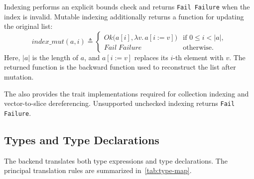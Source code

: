 Indexing performs an explicit bounds check and returns \texttt{Fail Failure} when the index is invalid.  Mutable indexing additionally returns a function for updating the original list:
\begin{equation}
  \mathit{index\_mut}(a,i) \triangleq
  \begin{cases}
    \mathit{Ok}\bigl(a[i],\lambda v.\,a[i:=v]\bigr)
      & \text{if }0\leq i<|a|,\\
    \mathit{Fail}\;\mathit{Failure}
      & \text{otherwise.}
  \end{cases}
  \label{eq:index-update}
\end{equation}
Here, \(|a|\) is the length of \(a\), and \(a[i:=v]\) replaces its \(i\)-th element with \(v\).  The returned function is the backward function used to reconstruct the list after mutation.

The \rprelude{} also provides the trait implementations required for
collection indexing and vector-to-slice dereferencing. Unsupported unchecked indexing returns \texttt{Fail Failure}.

\subsection{Types and Type Declarations}
\label{sec:types}

The backend translates both type expressions and type declarations. The principal translation rules are summarized in~\autoref{tab:type-map}.

